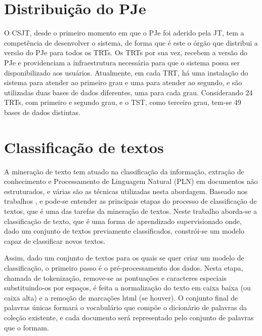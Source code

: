 \section{Distribuição do PJe}%

O CSJT, desde o primeiro momento em que o PJe foi aderido pela JT, tem a competência de desenvolver o sistema, de forma que é este o órgão que distribui a versão do PJe para todos os TRTs. Os TRTs por sua vez, recebem a versão do PJe e providenciam a infraestrutura necessária para que o sistema possa ser disponibilizado aos usuários. Atualmente, em cada TRT, há uma instalação do sistema para atender ao primeiro grau e uma para atender ao segundo, e são utilizadas duas bases de dados diferentes, uma para cada grau. Considerando 24 TRTs, com primeiro e segundo grau, e o TST, como terceiro grau, tem-se 49 bases de dados distintas. 



\section{Classificação de textos}%

A mineração de texto tem atuado na classificação da informação, extração de conhecimento  e Processamento de Linguagem Natural (PLN) em documentos não estruturados, e várias são as técnicas utilizadas nesta abordagem. Baseado nos trabalhos \cite{revisaotmana}, \cite{revisaotmdaniel} e \cite{briefreviewtm} pode-se entender as principais etapas do processo de classificação de textos, que é uma das tarefas da mineração de textos.  Neste trabalho aborda-se a classificação de texto, que é uma forma de aprendizado supervisionado onde, dado um conjunto de textos previamente classificados, constrói-se um modelo capaz de classificar novos textos.

Assim, dado um conjunto de textos para os quais se quer criar um modelo de classificação, o primeiro passo é o pré-processamento dos dados. Nesta etapa, chamada de tokenização, remove-se as pontuações    e caracteres especiais substituindo-os por espaços,  é feita a normalização do texto em caixa baixa (ou caixa alta) e a remoção de marcações html (se houver). O conjunto final de palavras únicas formará o vocabulário que compõe o dicionário de palavras da coleção existente, e cada documento será representado pelo conjunto de palavras que o formam. 

